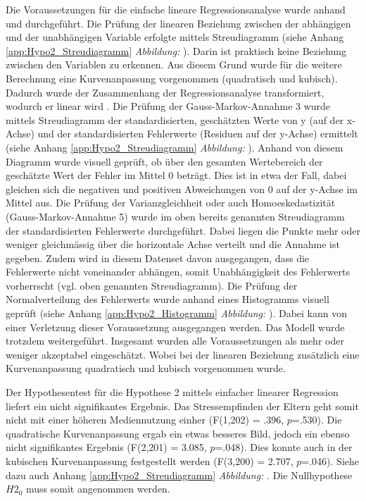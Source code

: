 Die Voraussetzungen für die einfache lineare Regressionsanalyse wurde anhand  und  durchgeführt. Die Prüfung der linearen Beziehung zwischen der abhängigen und der unabhängigen Variable erfolgte mittels Streudiagramm (siehe Anhang \ref{app:Hypo2_Streudiagramm}  \textit{Abbildung: } ). Darin ist praktisch keine Beziehung zwischen den Variablen zu erkennen. Aus diesem Grund wurde für die weitere Berechnung eine Kurvenanpassung vorgenommen (quadratisch und kubisch). Dadurch wurde der Zusammenhang der Regressionsanalyse transformiert, wodurch er linear wird \cite{UniversitatZurich2018}. Die Prüfung der Gauss-Markov-Annahme 3 \cite{UniversitatZurich2018} wurde mittels Streudiagramm der standardisierten, geschätzten Werte von y (auf der x-Achse) und der standardisierten Fehlerwerte (Residuen auf der y-Achse) ermittelt (siehe Anhang \ref{app:Hypo2_Streudiagramm} \textit{Abbildung: }). Anhand von diesem Diagramm wurde visuell geprüft, ob über den gesamten Wertebereich der geschätzte Wert der Fehler im Mittel 0 beträgt. Dies ist in etwa der Fall, dabei gleichen sich die negativen und positiven Abweichungen von 0 auf der y-Achse im Mittel aus. Die Prüfung der Varianzgleichheit oder auch Homoeskedastizität (Gauss-Markov-Annahme 5) wurde im oben bereits genannten Streudiagramm der standardisierten Fehlerwerte durchgeführt. Dabei liegen die Punkte mehr oder weniger gleichmässig über die horizontale Achse verteilt und die Annahme ist gegeben. Zudem wird in diesem Datenset davon ausgegangen, dass die Fehlerwerte nicht voneinander abhängen, somit Unabhängigkeit des Fehlerwerts vorherrscht (vgl. oben genannten Streudiagramm). Die Prüfung der Normalverteilung des Fehlerwerts wurde anhand eines Histogramms visuell geprüft (siehe Anhang \ref{app:Hypo2_Histogramm} \textit{Abbildung: }). Dabei kann von einer Verletzung dieser Voraussetzung ausgegangen werden. Das Modell wurde trotzdem weitergeführt. Insgesamt wurden alle Voraussetzungen als mehr oder weniger akzeptabel eingeschätzt. Wobei bei der linearen Beziehung zusätzlich eine Kurvenanpassung quadratisch und kubisch vorgenommen wurde.

Der Hypothesentest für die Hypothese 2 mittels einfacher linearer Regression liefert ein nicht signifikantes Ergebnis. Das Stressempfinden der Eltern geht somit nicht mit einer höheren Mediennutzung einher (F(1,202) = .396, $p$=.530). Die quadratische Kurvenanpassung ergab ein etwas besseres Bild, jedoch ein ebenso nicht signifikantes Ergebnis (F(2,201) = 3.085, $p$=.048). Dies konnte auch in der kubischen Kurvenanpassung festgestellt werden (F(3,200) = 2.707, $p$=.046). Siehe dazu auch Anhang \ref{app:Hypo2_Streudiagramm} \textit{Abbildung: }. Die Nullhypothese $H2_{0}$ muss somit angenommen werden.

